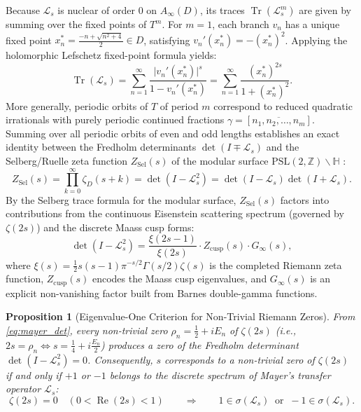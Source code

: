 \documentclass[11pt,a4paper]{article}
\newtheorem{proposition}[theorem]{Proposition}
\newcommand{\Tr}{\operatorname{Tr}}
\newcommand{\Det}{\operatorname{det}}
\newcommand{\Real}{\operatorname{Re}}
\begin{document}
Because $\mathcal{L}_s$ is nuclear of order $0$ on $A_\infty(D)$, its traces $\Tr(\mathcal{L}_s^m)$ are given by summing over the fixed points of $T^m$. For $m=1$, each branch $v_n$ has a unique fixed point $x_n^* = \frac{-n + \sqrt{n^2 + 4}}{2} \in D$, satisfying $v_n'(x_n^*) = -(x_n^*)^2$. Applying the holomorphic Lefschetz fixed-point formula yields:
\begin{equation}
\Tr(\mathcal{L}_s) = \sum_{n=1}^{\infty} \frac{\lvert v_n'(x_n^*)\rvert^s}{1 - v_n'(x_n^*)} = \sum_{n=1}^{\infty} \frac{(x_n^*)^{2s}}{1 + (x_n^*)^2}.
\end{equation}
More generally, periodic orbits of $T$ of period $m$ correspond to reduced quadratic irrationals with purely periodic continued fractions $\gamma = [\overline{n_1, n_2, \dots, n_m}]$. Summing over all periodic orbits of even and odd lengths establishes an exact identity between the Fredholm determinants $\Det(I \mp \mathcal{L}_s)$ and the Selberg/Ruelle zeta function $Z_{\mathrm{Sel}}(s)$ of the modular surface $\mathrm{PSL}(2,\mathbb{Z}) \backslash \mathbb{H}$ \cite{Mayer1991,LewisZagier2001}:
\begin{equation}
Z_{\mathrm{Sel}}(s) = \prod_{k=0}^{\infty} \zeta_D(s + k) = \Det\left(I - \mathcal{L}_s^2\right) = \Det(I - \mathcal{L}_s)\Det(I + \mathcal{L}_s).
\end{equation}
By the Selberg trace formula for the modular surface, $Z_{\mathrm{Sel}}(s)$ factors into contributions from the continuous Eisenstein scattering spectrum (governed by $\zeta(2s)$) and the discrete Maass cusp forms:
\begin{equation}\label{eq:mayer_det}
\Det\left(I - \mathcal{L}_s^2\right) = \frac{\xi(2s - 1)}{\xi(2s)} \cdot Z_{\mathrm{cusp}}(s) \cdot G_{\infty}(s),
\end{equation}
where $\xi(s) = \frac{1}{2}s(s-1)\pi^{-s/2}\Gamma(s/2)\zeta(s)$ is the completed Riemann zeta function, $Z_{\mathrm{cusp}}(s)$ encodes the Maass cusp eigenvalues, and $G_{\infty}(s)$ is an explicit non-vanishing factor built from Barnes double-gamma functions.

\begin{proposition}[Eigenvalue-One Criterion for Non-Trivial Riemann Zeros]
From \eqref{eq:mayer_det}, every non-trivial zero $\rho_n = \frac{1}{2} + iE_n$ of $\zeta(2s)$ (i.e., $2s = \rho_n \iff s = \frac{1}{4} + i\frac{E_n}{2}$) produces a zero of the Fredholm determinant $\Det(I - \mathcal{L}_s^2) = 0$. Consequently, $s$ corresponds to a non-trivial zero of $\zeta(2s)$ if and only if $+1$ or $-1$ belongs to the discrete spectrum of Mayer's transfer operator $\mathcal{L}_s$:
\begin{equation}
\zeta(2s) = 0 \quad (0 < \Real(2s) < 1) \qquad \Longrightarrow \qquad 1 \in \sigma(\mathcal{L}_s) \;\;\text{or}\;\; -1 \in \sigma(\mathcal{L}_s).
\end{equation}
\end{proposition}
\end{document}
